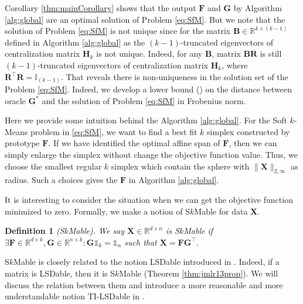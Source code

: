 \documentclass[journal]{IEEEtran}
\begin{document}
\begin{remark}\label{remark:proof_sketch_unique}
	Corollary \ref{thm:mainCorollary} shows that the output $\mathbf{F}$ and $\mathbf{G}$ by Algorithm \ref{alg:global}
	are an optimal solution of Problem \eqref{eq:SfM}. But we note that the solution of Problem \eqref{eq:SfM}
	is not unique since for the matrix $\mathbf{B}\in\mathbb{R}^{k\times (k-1)}$ defined in Algorithm \ref{alg:global} as
	the $(k-1)$-truncated eigenvectors of centralization matrix $\mathbf{H}_k$ is not unique. Indeed, for any $\mathbf{B}$, 
	matrix $\mathbf{BR}$ is still $(k-1)$-truncated eigenvectors of centralization matrix $\mathbf{H}_k$, where $\mathbf{R}^\top\mathbf{R}=\mathbb{I}_{(k-1)}$.
	That reveals there is non-uniqueness in the solution set of the Problem \eqref{eq:SfM}.
	Indeed, we develop a lower bound () on the distance between oracle $\mathbf{G}^*$ and the solution of Problem \eqref{eq:SfM} in Frobenius norm.
\end{remark}

\begin{remark}\label{remark:intuition}
	Here we provide some intuition behind the Algorithm \ref{alg:global}.
	For the Soft $k$-Means problem in \eqref{eq:SfM}, we want to find a best fit $k$ simplex constructed by prototype $\mathbf{F}$.
	If we have identified the optimal affine span of $\mathbf{F}$, then we can simply enlarge the simplex without change the
	objective function value. Thus, we choose the smallest regular $k$ simplex which contain the sphere with $\|\mathbf{X}\|_{2,\infty}$ as
	radius. Such a choices gives the $\mathbf{F}$ in Algorithm \ref{alg:global}.
\end{remark}

It is interesting to consider the situation when we can get the objective function minimized to zero.
Formally, we make a notion of S$k$Mable for data $\mathbf{X}$.

\newenvironment{definition}[1]{\par\noindent\textbf{Definition 1} \it}{}
\begin{definition}((S$k$Mable).
	We say $\mathbf{X} \in \mathbb{R}^{d\times n}$ is S$k$Mable if
	$
	\exists \mathbf{F}\in\mathbb{R}^{d\times k}, \mathbf{G}\in\mathbb{R}^{n\times k}:\mathbf{G}\mathbb{1}_k=\mathbb{1}_n
	$
	such that
	$
	\mathbf{X}=\mathbf{FG}^\top.
	$
\end{definition}

S$k$Mable is closely related to the notion LSDable introduced in \cite{arora2013similarity}.
Indeed, if a matrix is LSDable, then it is S$k$Mable (Theorem \ref{thm:jmlr13prop}).
We will discuss the relation between them and introduce a more reasonable and more understandable notion TI-LSDable in .
\end{document}
